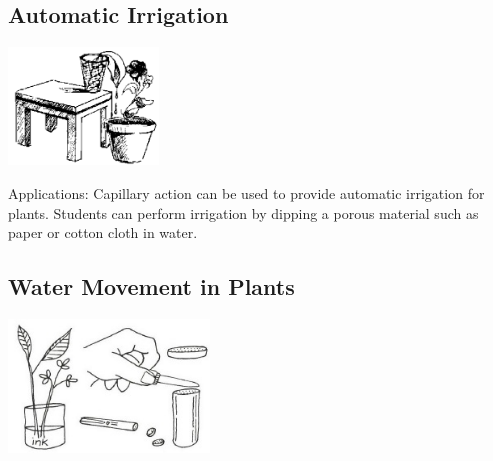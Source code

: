 \begin{multicols}{2}
\subsection{Automatic Irrigation} 

\begin{center}
\includegraphics[width=0.3\textwidth]{./img/source/irrigation.png}
\end{center}

\begin{description*}
\item[Applications:]{Capillary action can be used to provide automatic irrigation for plants. Students can perform irrigation by dipping a porous material such as paper or cotton cloth in water.}
\end{description*}

\subsection{Water Movement in Plants} %

\begin{center}
\includegraphics[width=0.4\textwidth]{./img/vso/water-movement.jpg}
\end{center}


\end{multicols}

